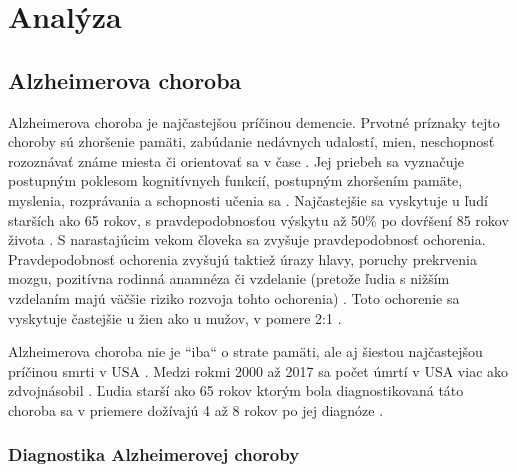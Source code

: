 \chapter{Analýza}

\section{Alzheimerova choroba \label{sec:ad}}

Alzheimerova choroba je najčastejšou príčinou demencie. Prvotné príznaky tejto choroby sú zhoršenie pamäti, zabúdanie nedávnych udalostí, mien, neschopnosť rozoznávať známe miesta či orientovať sa v čase \cite{Alzheimer.sk_2019}. Jej priebeh sa vyznačuje postupným poklesom kognitívnych funkcií, postupným zhoršením pamäte, myslenia, rozprávania a schopnosti učenia sa \cite{duthey2013background}. Najčastejšie sa vyskytuje u ľudí starších ako 65 rokov, s pravdepodobnosťou výskytu až 50\% po dovŕšení 85 rokov života \cite{duthey2013background}.
S narastajúcim vekom človeka sa zvyšuje pravdepodobnosť ochorenia. Pravdepodobnosť ochorenia zvyšujú taktiež úrazy hlavy, poruchy prekrvenia mozgu, pozitívna rodinná anamnéza či vzdelanie (pretože ľudia s nižším vzdelaním majú väčšie riziko rozvoja tohto ochorenia) \cite{Alzheimer.sk_2019}. Toto ochorenie sa vyskytuje častejšie u žien ako u mužov, v pomere 2:1 \cite{khan2016biomarkers}.

Alzheimerova choroba nie je ``iba`` o strate pamäti, ale aj šiestou najčastejšou príčinou smrti v USA \cite{Figures_2017}. Medzi rokmi 2000 až 2017 sa počet úmrtí v USA viac ako zdvojnásobil \cite{Figures_2017}. Ľudia starší ako 65 rokov ktorým bola diagnostikovaná táto choroba sa v priemere dožívajú 4 až 8 rokov po jej diagnóze \cite{Figures_2017}.


\subsection{Diagnostika Alzheimerovej choroby}

